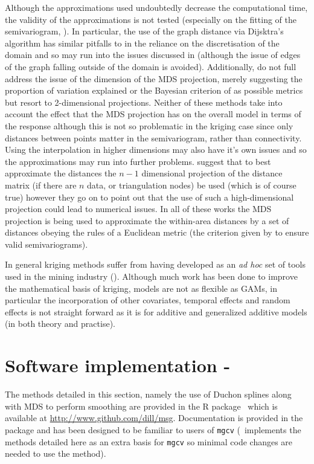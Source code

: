Although the approximations used undoubtedly decrease the computational time, the validity of the approximations is not tested (especially on the fitting of the semivariogram, ). In particular, the use of the graph distance via Dijsktra's algorithm has similar pitfalls to  in the reliance on the discretisation of the domain and so may run into the issues discussed in  (although the issue of edges of the graph falling outside of the domain is avoided). Additionally,  do not full address the issue of the dimension of the MDS projection, merely suggesting the proportion of variation explained or the Bayesian criterion of  as possible metrics but resort to 2-dimensional projections. Neither of these methods take into account the effect that the MDS projection has on the overall model in terms of the response although this is not so problematic in the kriging case since only distances between points matter in the semivariogram, rather than connectivity. Using the interpolation in higher dimensions may also have it's own issues and so the approximations may run into further problems.  suggest that to best approximate the distances the $n-1$ dimensional projection of the distance matrix (if there are $n$ data, or triangulation nodes) be used (which is of course true) however they go on to point out that the use of such a high-dimensional projection could lead to numerical issues. In all of these works the MDS projection is being used to approximate the within-area distances by a set of distances obeying the rules of a Euclidean metric (the criterion given by  to ensure valid semivariograms). 

In general kriging methods suffer from having developed as an \textit{ad hoc} set of tools used in the mining industry (\cite[preface]{diggle}). Although much work has been done to improve the mathematical basis of kriging, models are not as flexible as GAMs, in particular the incorporation of other covariates, temporal effects and random effects is not straight forward as it is for additive and generalized additive models (in both theory and practise).

\section{Software implementation - \mdspack}
\label{gds-software}

The methods detailed in this section, namely the use of Duchon splines along with MDS to perform smoothing are provided in the \textsf{R} package \mdspack\ which is available at \url{http://www.github.com/dill/msg}. Documentation is provided in the package and has been designed to be familiar to users of \texttt{mgcv} (\mdspack\ implements the methods detailed here as an extra basis for \texttt{mgcv} so minimal code changes are needed to use the method).




